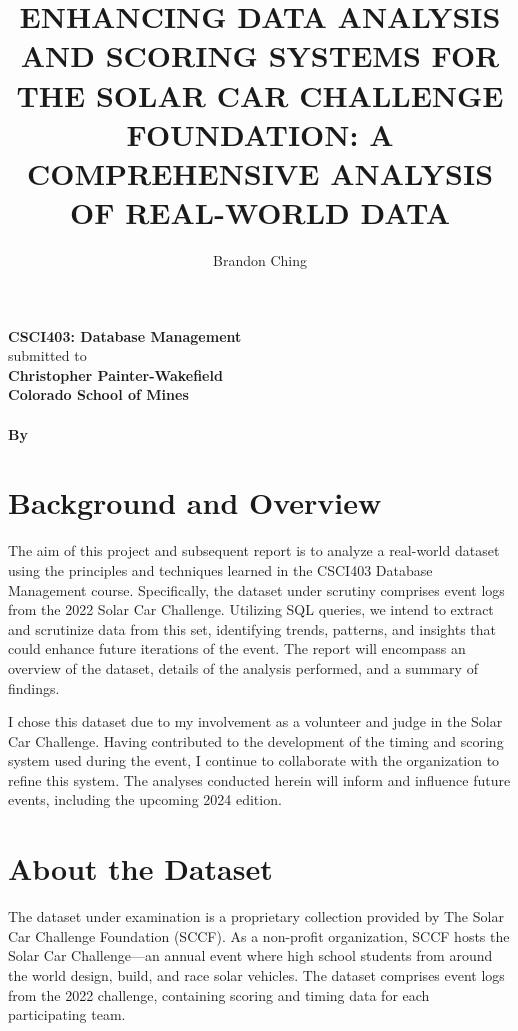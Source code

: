 \documentclass[11pt]{article}
\title{\uppercase{Enhancing Data Analysis and Scoring Systems for the Solar Car Challenge Foundation: A Comprehensive Analysis of Real-World Data}}
\author{Brandon Ching}
\begin{document}
\makeatletter
\begin{titlepage}
    \begin{center}
        \normalsize
        \vspace*{2.5cm}
        \LARGE\textbf{CSCI403: Database Management \bigbreak
            \@title}
        \normalsize
        \\ [3.5cm]
        submitted to\\
        \textbf{
        Christopher Painter-Wakefield\\
        Colorado School of Mines
        \\ [1cm]
        \@date
        \\ [4cm]
        By\\
        \@author}
    \end{center}
\end{titlepage}
\makeatother

\section{Background and Overview}

The aim of this project and subsequent report is to analyze a real-world dataset using the principles and techniques learned in the CSCI403 Database Management course. Specifically, the dataset under scrutiny comprises event logs from the 2022 Solar Car Challenge. Utilizing SQL queries, we intend to extract and scrutinize data from this set, identifying trends, patterns, and insights that could enhance future iterations of the event. The report will encompass an overview of the dataset, details of the analysis performed, and a summary of findings.

I chose this dataset due to my involvement as a volunteer and judge in the Solar Car Challenge. Having contributed to the development of the timing and scoring system used during the event, I continue to collaborate with the organization to refine this system. The analyses conducted herein will inform and influence future events, including the upcoming 2024 edition.

\section{About the Dataset}

The dataset under examination is a proprietary collection provided by The Solar Car Challenge Foundation (SCCF). As a non-profit organization, SCCF hosts the Solar Car Challenge—an annual event where high school students from around the world design, build, and race solar vehicles. The dataset comprises event logs from the 2022 challenge, containing scoring and timing data for each participating team.
\end{document}
